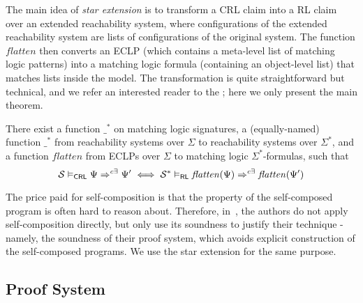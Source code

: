 The main idea of \emph{star extension} is to transform a CRL claim into a RL claim over an extended reachability system,
where configurations of the extended reachability system are lists of configurations of the original system.
The function $\mathit{flatten}$ then converts an ECLP (which contains a meta-level list of matching logic patterns)
into a matching logic formula (containing an object-level list) that matches lists inside the model.
The transformation is quite straightforward but technical, and we refer an interested reader to the ;
here we only present the main theorem.
\begin{theorem}\label{thm:CRLandRLcorrespondence}
  There exist a function $\_^*$ on matching logic signatures,
  a (equally-named) function $\_^*$ from reachability systems over $\Sigma$ to reachability systems over $\Sigma^*$,
  and a function $\mathit{flatten}$ from ECLPs over $\Sigma$ to matching logic $\Sigma^*$-formulas,
  such that
  \begin{equation*}
  \mathcal{S} \vDash_{\mathsf{CRL}} \Psi \Rightarrow^{c\exists} \Psi^\prime
    \iff \mathcal{S}^* \vDash_{\mathsf{RL}} \mathit{flatten}(\Psi) \Rightarrow^{c\exists} \mathit{flatten}(\Psi^\prime)
  \end{equation*}
\end{theorem}


The price paid for self-composition is that the property of the self-composed program is often hard to reason about.
Therefore, in~\cite{SousaD16}, the authors do not apply self-composition directly, but only use its soundness to justify
their technique - namely, the soundness of their proof system, which avoids explicit construction
of the self-composed programs.
We use the star extension for the same purpose.



\subsection{Proof System}




